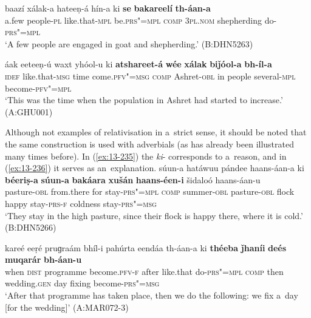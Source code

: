 \ex
\label{ex:13-233}
\gll baazí xálak-a hateeṇ-á hín-a ki \textbf{se} \textbf{bakareelí} \textbf{th-áan-a}\\
a.few people-\textsc{pl}  like.that-\textsc{mpl} be.\textsc{prs"=mpl} \textsc{comp}  \textsc{3pl.nom}  shepherding do-\textsc{prs"=mpl} \\
\glt `A few people are engaged in goat and shepherding.' (B:DHN5263)

\ex
\label{ex:13-234}
\gll áak eeteeṇ-ú waxt yhóol-u ki  \textbf{atshareet-á} \textbf{wée} \textbf{xálak} \textbf{biǰóol-a} \textbf{bh-íl-a} \\
\textsc{idef} like.that-\textsc{msg} time come.\textsc{pfv"=msg} \textsc{comp} Ashret-\textsc{obl} in people several-\textsc{mpl} become-\textsc{pfv"=mpl} \\
\glt `This was the time when the population in Ashret had started to increase.' (A:GHU001) 
\z

Although not examples of relativisation in a~strict sense, it should be noted that the same construction is used with  adverbials (as has already been illustrated many times before). In (\ref{ex:13-235}) the \textit{ki}- corresponds to a~reason, and in (\ref{ex:13-236}) it serves as an~explanation.
\ea
\label{ex:13-235}
\gll súun-a hatáwuu pándee haans-áan-a ki \textbf{béeriṣ-a} \textbf{súun-a} \textbf{bakáara} \textbf{xušán} \textbf{haans-éen-i} šidaloó haans-áan-u\\
pasture-\textsc{obl} from.there for stay-\textsc{prs"=mpl} \textsc{comp}  summer-\textsc{obl} pasture-\textsc{obl} flock happy stay-\textsc{prs-f} coldness stay-\textsc{prs"=msg}\\
\glt `They stay in the high pasture, since their flock is happy there, where it is cold.' (B:DHN5266)

\ex
\label{ex:13-236}
\gll kareé eeṛé pruɡraám bhíl-i pahúrta eendáa  th-áan-a ki \textbf{théeba} \textbf{ǰhaníi} \textbf{deés} \textbf{muqarár} \textbf{bh-áan-u}\\
when \textsc{dist} programme become.\textsc{pfv-f} after like.that do-\textsc{prs"=mpl} \textsc{comp} then wedding.\textsc{gen} day fixing become-\textsc{prs"=msg}\\
\glt `After that programme has taken place, then we do the following: we fix a~day [for the wedding]' (A:MAR072-3)
\z